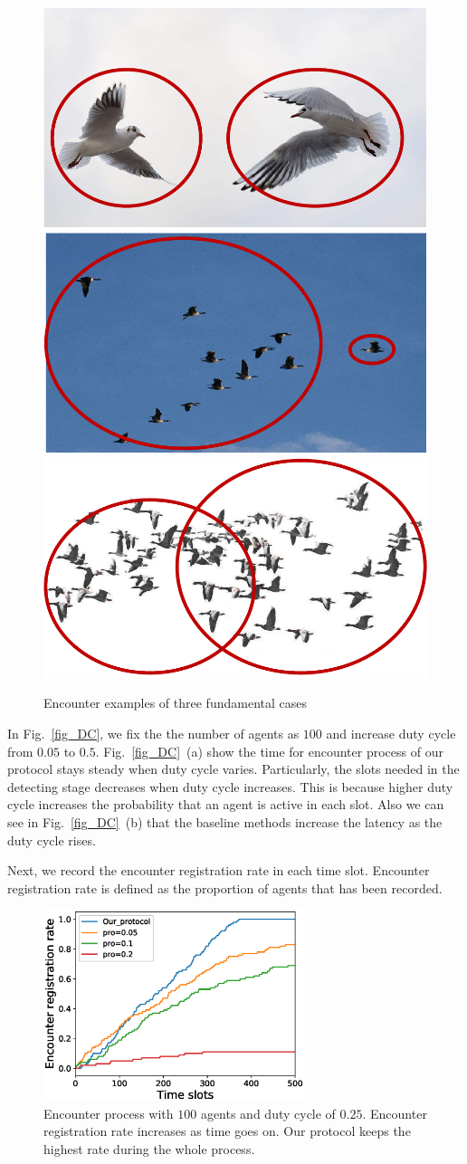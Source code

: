\begin{figure}[!t]
    \includegraphics[width=.32\textwidth]{figures/AtoA}
    \includegraphics[width=.32\textwidth]{figures/AtoG}
    \includegraphics[width=.32\textwidth]{figures/GtoG}
    \caption{Encounter examples of three fundamental cases}
    \label{examples}
\end{figure}

In Fig.~\ref{fig_DC}, we fix the the number of agents as $100$ and
increase duty cycle from $0.05$ to $0.5$. Fig.~\ref{fig_DC}~(a) show 
the time for encounter process of our protocol stays steady when duty cycle varies.
Particularly, the slots needed in the detecting stage decreases when duty cycle increases.
This is because higher duty cycle increases the probability that an agent is active in each slot.
Also we can see in Fig.~\ref{fig_DC}~(b) that the baseline methods
increase the latency as the duty cycle rises.

Next, we record the encounter registration rate in each time slot.
Encounter registration rate is defined as the proportion of agents that has been 
recorded. 

\begin{figure}[h]
    \centering
    \includegraphics[width=3in]{figures/figure5.eps}
    \caption{Encounter process with $100$ agents and duty cycle of $0.25$. 
    Encounter registration rate increases as time goes on. Our protocol keeps
    the highest rate during the whole process.}
    \label{fig5}
\end{figure}

